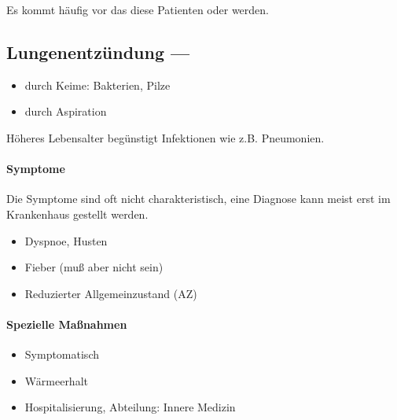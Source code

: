 Es kommt häufig vor das diese Patienten  oder 
 werden. 




\subsection{Lungenentzündung --- }

\begin{itemize}
    \item durch Keime: Bakterien, Pilze
    
    \item durch Aspiration
    
\end{itemize}

Höheres Lebensalter begünstigt Infektionen wie z.B. Pneumonien.

\paragraph*{
Symptome}

Die Symptome sind oft nicht charakteristisch, eine Diagnose kann meist
erst im Krankenhaus gestellt werden. 

\begin{itemize}
    \item 
    Dyspnoe, Husten
    
    \item 
    Fieber (mu{\ss} aber nicht sein)
    
    \item 
    Reduzierter Allgemeinzustand (AZ)
    
\end{itemize}

\begin{gMassnahmenEnv}
    
    \paragraph*{
    Spezielle Ma{\ss}nahmen}
    
    \begin{itemize}
        \item
        Symptomatisch
        
        \item
        Wärmeerhalt

        \item 
        Hospitalisierung, Abteilung: Innere Medizin
        
    \end{itemize}
    
\end{gMassnahmenEnv}


